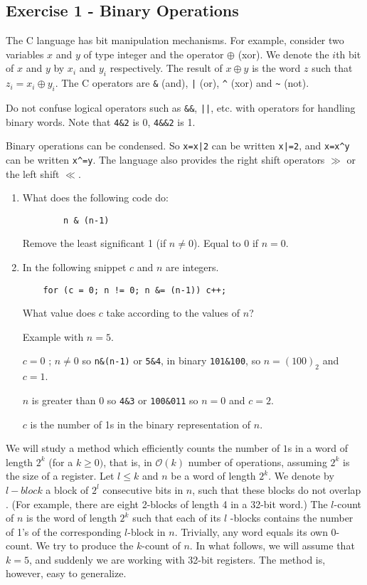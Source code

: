 \documentclass[11pt]{article}
\newcommand{\numtd}{03}
\newcommand{\titretd}{Integers and Bit Representation}
\begin{document}
	
	\entete{\numtd}{\titretd}

\subsection*{Exercise 1 - Binary Operations}
The C language has bit manipulation mechanisms. For example, consider two variables $x$ and $y$ of type integer and the operator $\oplus$ (xor). We denote the $i$th bit of $x$ and $y$ by $x_i$ and $y_i$ respectively. The result of  $x \oplus y$ is the word $z$ such that $z_i = x_i \oplus y_i$.
The C operators are \verb+&+ (and), \verb+|+ (or), \verb+^+ (xor) and \verb+~+ (not). 

Do not confuse logical operators such as \verb+&&+, \verb+||+, etc. with operators for handling binary words. Note that \verb+4&2+ is 0, \verb+4&&2+ is 1.

Binary operations can be condensed. So \verb+x=x|2+ can be written \verb+x|=2+, and \verb+x=x^y+ can be written \verb+x^=y+. The language also provides the right shift operators $\gg$ or the left shift $\ll$.

\begin{enumerate}
	\item What does the following code do:
	\begin{verbatim}
		n & (n-1)
	\end{verbatim}
\begin{solution}
	Remove the least significant 1 (if $ n \ne 0 $). Equal to 0 if $ n = 0 $.
	\end{solution}

 \item In the following snippet $c$ and $n$ are integers.
\begin{verbatim}
	for (c = 0; n != 0; n &= (n-1)) c++;
\end{verbatim}
What value does $c$ take according to the values of $n$?
\begin{solution}
	Example with $n=5$.
	
	$c=0$ ; $n\ne0$ so \verb+n&(n-1)+ or \verb+5&4+, in binary \verb+101&100+,
	so $n=(100)_2$ and $c=1$.
	
	$n$ is greater than 0 so \verb+4&3+ or \verb+100&011+
	so $n=0$ and $c=2$.
	
	$c$ is the number of 1s in the binary representation of $n$.
\end{solution}
\end{enumerate}


We will study a method which efficiently counts the number of $1$s in a word of length $2^k$
(for a $k \geq 0)$, that is, in $\mathcal{O}(k)$ number of operations, assuming $2^k$ is the size of a register.
Let $l \leq k$ and $n$ be a word of length $2^k$. We denote by $l-block$ a block of $2^l$ consecutive bits in $n$, such that these blocks do not overlap . (For example, there are eight 2-blocks of length 4 in a 32-bit word.) The $l$-count of $n$ is the word of length $2^k$ such that each of its $l$ -blocks contains the number of 1's of the corresponding $l$-block in $n$. Trivially, any word equals its own 0-count. We try to produce the $k$-count of $n$.
In what follows, we will assume that $k = 5$, and suddenly we are working with 32-bit registers. The method is, however, easy to generalize.
\end{document}
